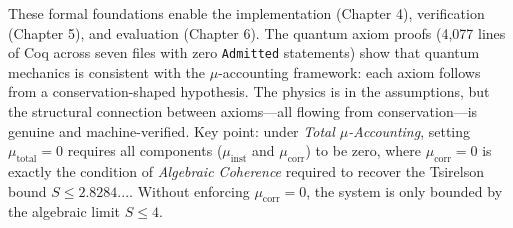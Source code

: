 These formal foundations enable the implementation (Chapter 4), verification (Chapter 5), and evaluation (Chapter 6). The quantum axiom proofs (4,077 lines of Coq across seven files with zero \texttt{Admitted} statements) show that quantum mechanics is consistent with the $\mu$-accounting framework: each axiom follows from a conservation-shaped hypothesis. The physics is in the assumptions, but the structural connection between axioms---all flowing from conservation---is genuine and machine-verified. Key point: under \emph{Total $\mu$-Accounting}, setting $\mu_{\text{total}} = 0$ requires all components ($\mu_{\text{inst}}$ and $\mu_{\text{corr}}$) to be zero, where $\mu_{\text{corr}} = 0$ is exactly the condition of \emph{Algebraic Coherence} required to recover the Tsirelson bound $S \le 2.8284...$. Without enforcing $\mu_{\text{corr}} = 0$, the system is only bounded by the algebraic limit $S \le 4$.
